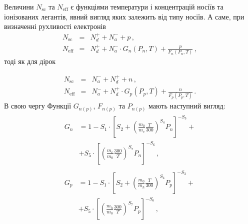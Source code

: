 \documentclass[fleqn,twoside,twocolumn,nofootinbib,showkeys]{revtex4} %
\begin{document}
Величини $N_\mathrm{sc}$ та $N_\mathrm{eff}$ є функціями температури і
концентрацій носіїв та іонізованих легантів, явний вигляд яких залежить від типу носіїв.
А саме,
при визначенні рухливості електронів
\begingroup
\renewcommand{\theequation}{\thesection\arabic{equation}а}
\begin{eqnarray}
  \label{eqK4a}
  N_\mathrm{sc} &=&N_d^+ + N_a^-+ p\,, \\
  \label{eqK5a}
  N_\mathrm{eff} &=&N_d^+ + N_a^- \cdot G_n(P_n,T) +\frac{p}{F_n(P_n,T)}\,,
\end{eqnarray}
\endgroup
тоді як для дірок
\addtocounter{equation}{-2}
\begingroup
\renewcommand{\theequation}{\thesection\arabic{equation}б}
\begin{eqnarray}
  \label{eqK4b}
  N_\mathrm{sc}&=& N_a^-+N_d^++n\,, \\
  \label{eqK5b}
  N_\mathrm{eff}&=& N_a^- + N_d^+ \cdot G_p(P_p,T) +\frac{n}{F_p(P_p,T)}\,.
\end{eqnarray}
\endgroup
\noindent
В свою чергу Функції $G_{n(p)}$, $F_{n(p)}$  та $P_{n(p)}$ мають наступний вигляд:
\begin{subequations} \label{eqK6}
    \begin{align}
    \begin{split}
       G_n& = 1 - S_1\cdot\left[S_2 + \left( \frac{m_0}{m_e} \frac{T}{300} \right)^{S_4} P_n\right]^{-S_3}+\\
       &+ S_5\cdot\left[ \left(\frac{m_e}{m_0} \frac{300}{T}\right)^{S_7} P_n\right]^{-S_6}\,, \label{eqK6a}
       \end{split} \\
       \begin{split}
       G_p& = 1 - S_1\cdot\left[S_2 + \left( \frac{m_0}{m_h} \frac{T}{300} \right)^{S_4} P_p\right]^{-S_3}+\\
       &+ S_5\cdot\left[ \left(\frac{m_h}{m_0} \frac{300}{T}\right)^{S_7} P_p\right]^{-S_6}\,, \label{eqK6b}
       \end{split}
    \end{align}
\end{subequations}
\end{document}
